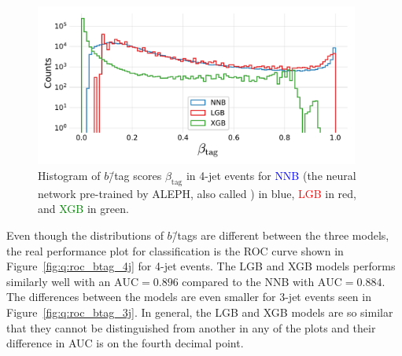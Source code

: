 \begin{figure}[h!]
  \vspace{-0.3cm}
  \centerfloat
  \includegraphics[width=0.95\textwidth, trim=5 15 10 10, clip]{figures/quarks/y_pred_4_jet_hist-down_sample=1.00-ML_vars=vertex-selection=b-ejet_min=4-n_iter_RS_lgb=99-n_iter_RS_xgb=9-cdot_cut=0.90-version=19.pdf}
  \caption[$b$\=/Tag Scores in 4-Jet Events]
          {Histogram of $b$\=/tag scores $\beta_\mathrm{tag}$ in 4-jet events for \textcolor{blue}{NNB} (the neural network pre-trained by ALEPH, also called ) in blue, \textcolor{red}{LGB} in red, and \textcolor{green}{XGB} in green. 
          } 
  \label{fig:q:btag_scores_4j}
\end{figure}
\vspace{-0.3cm}

Even though the distributions of $b$\=/tags are different between the three models, the real performance plot for classification is the ROC curve shown in Figure~\ref{fig:q:roc_btag_4j} for 4-jet events. The LGB and XGB models performs similarly well with an $\mathrm{AUC}=0.896$ compared to the NNB with $\mathrm{AUC}=0.884$. The differences between the models are even smaller for 3-jet events seen in Figure~\ref{fig:q:roc_btag_3j}. In general, the LGB and XGB models are so similar that they cannot be distinguished from another in any of the plots and their difference in AUC is on the fourth decimal point. \label{page:q:timings_b_tag}

